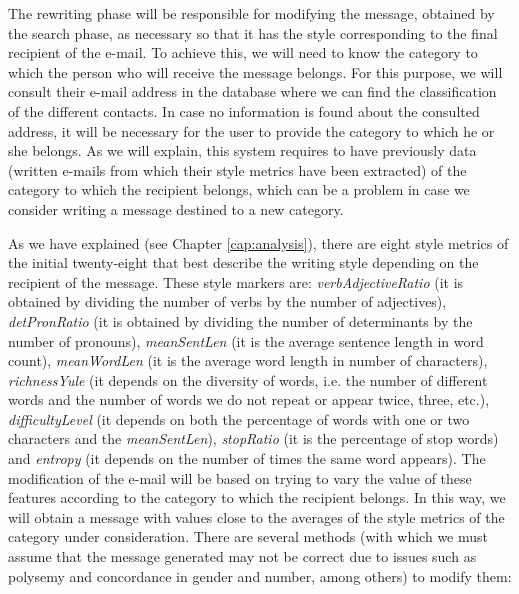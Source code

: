 The rewriting phase will be responsible for modifying the message, obtained by the search phase, as necessary so that it has the style corresponding to the final recipient of the e-mail. To achieve this, we will need to know the category to which the person who will receive the message belongs. For this purpose, we will consult their e-mail address in the database where we can find the classification of the different contacts. In case no information is found about the consulted address, it will be necessary for the user to provide the category to which he or she belongs. As we will explain, this system requires to have previously data (written e-mails from which their style metrics have been extracted) of the category to which the recipient belongs, which can be a problem in case we consider writing a message destined to a new category.

As we have explained (see Chapter \ref{cap:analysis}), there are eight style metrics of the initial twenty-eight that best describe the writing style depending on the recipient of the message. These style markers are: \textit{verbAdjectiveRatio} (it is obtained by dividing the number of verbs by the number of adjectives), \textit{detPronRatio} (it is obtained by dividing the number of determinants by the number of pronouns), \textit{meanSentLen} (it is the average sentence length in word count), \textit{meanWordLen} (it is the average word length in number of characters), \textit{richnessYule} (it depends on the diversity of words, i.e. the number of different words and the number of words we do not repeat or appear twice, three, etc.), \textit{difficultyLevel} (it depends on both the percentage of words with one or two characters and the \textit{meanSentLen}), \textit{stopRatio} (it is the percentage of stop words) and \textit{entropy} (it depends on the number of times the same word appears). The modification of the e-mail will be based on trying to vary the value of these features according to the category to which the recipient belongs. In this way, we will obtain a message with values close to the averages of the style metrics of the category under consideration. There are several methods (with which we must assume that the message generated may not be correct due to issues such as polysemy and concordance in gender and number, among others) to modify them:

